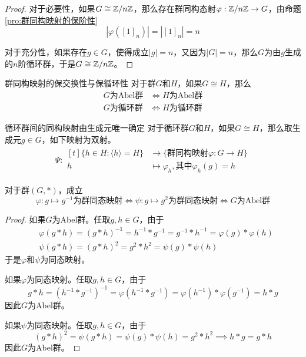 \begin{proof}
	对于必要性，如果$G\cong \mathbb{Z}/n\mathbb{Z}$，那么存在群同构态射$\varphi:\mathbb{Z}/n\mathbb{Z}\to G$，由命题\ref{pro:群同构映射的保阶性}
	$$
	|\varphi([1]_n)|=|[1]_n|=n
	$$
	
	对于充分性，如果存在$g\in G$，使得成立$|g|=n$，又因为$|G|=n$，那么$G$为由$g$生成的$n$阶循环群，于是$G\cong \mathbb{Z}/n\mathbb{Z}$。
\end{proof}

\begin{proposition}{群同构映射的保交换性与保循环性}
	对于群$G$和$H$，如果$G\cong H$，那么
	\begin{align*}
		G \text{为Abel群} & \iff
		H \text{为Abel群}\\
		G \text{为循环群} & \iff
		H \text{为循环群}
	\end{align*}
\end{proposition}

\begin{proposition}{循环群间的同构映射由生成元唯一确定}
	对于循环群$G$和$H$，如果$G\cong H$，那么取生成元$g\in G$，如下映射为双射。
	\begin{align*}
		\Psi:\begin{aligned}[t]
			\{ h\in H:\langle h \rangle =H \}&\longrightarrow \{ \text{群同构映射}\varphi:G\to H \}\\
			h&\longmapsto \varphi_h,\text{其中}\varphi_h(g)=h
		\end{aligned}
	\end{align*}
\end{proposition}

\begin{proposition}
	对于群$(G,*)$，成立
	$$
	\varphi:g\mapsto g^{-1}\text{为群同态映射}\iff
	\psi:g\mapsto g^2\text{为群同态映射}\iff
	G\text{为Abel群}
	$$
\end{proposition}

\begin{proof}
	如果$G$为Abel群。任取$g,h\in G$，由于
	\begin{align*}
		&\varphi(g*h)=(g*h)^{-1}=h^{-1}*g^{-1}=g^{-1}*h^{-1}=\varphi(g)*\varphi(h)\\
		&\psi(g*h)=(g*h)^2=g^2*h^2=\psi(g)*\psi(h)
	\end{align*}
	于是$\varphi$和$\psi$为同态映射。
	
	如果$\varphi$为同态映射。任取$g,h\in G$，由于
	\[ 
	g*h=(h^{-1}*g^{-1})^{-1}=\varphi(h^{-1}*g^{-1})=\varphi(h^{-1})*\varphi(g^{-1})=h*g
	 \]
	 因此$G$为Abel群。
	 
	 如果$\psi$为同态映射。任取$g,h\in G$，由于
	 \[ 
	 (g*h)^2=\psi(g*h)=\psi(g)*\psi(h)=g^2*h^2\implies h*g=g*h
	 \]
	 因此$G$为Abel群。
\end{proof}

